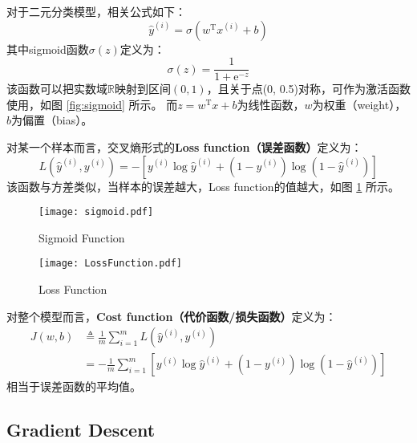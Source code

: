 对于二元分类模型，相关公式如下：
\begin{equation}
    \hat{y}^{(i)} = \sigma(w^\mathrm{T} x^{(i)} + b) \label{eq:logistic}
\end{equation}
其中sigmoid函数$\sigma(z)$定义为：
\begin{equation}
    \sigma(z) = \frac{1}{1 + \mathrm{e}^{-z}} \label{eq:sigmoid}
\end{equation}
该函数可以把实数域$\mathbb{R}$映射到区间$(0, 1)$，且关于点(0, 0.5)对称，可作为激活函数使用，如图 \ref{fig:sigmoid} 所示。
而$z = w^\mathrm{T} x + b$为线性函数，$w$为权重（weight），$b$为偏置（bias）。

对某一个样本而言，交叉熵形式的\textbf{Loss function（误差函数）}定义为：
\begin{equation}
    L(\hat{y}^{(i)}, y^{(i)}) = -\left[y^{(i)} \log \hat{y}^{(i)} + (1 - y^{(i)}) \log (1 - \hat{y}^{(i)})\right] \label{eq:loss}
\end{equation}
该函数与方差类似，当样本的误差越大，Loss function的值越大，如图 \ref{fig:loss} 所示。
\begin{figure}[h!bt]
    \centering
    \begin{minipage}[t]{0.48\textwidth}
        \centering
        \texttt{[image: sigmoid.pdf]}
        \caption{Sigmoid Function}
        \label{fig:sigmoid}
    \end{minipage}
    \begin{minipage}[t]{0.48\textwidth}
        \centering
        \texttt{[image: LossFunction.pdf]}
        \caption{Loss Function}
        \label{fig:loss}
    \end{minipage}
\end{figure}

对整个模型而言，\textbf{Cost function（代价函数/损失函数）}定义为：
\begin{equation}
    \begin{aligned}
        J(w, b) &\triangleq  \frac{1}{m} \sum_{i=1}^{m} L(\hat{y}^{(i)}, y^{(i)}) \\
        &= -\frac{1}{m} \sum_{i=1}^{m} \left[y^{(i)} \log \hat{y}^{(i)} + (1 - y^{(i)}) \log (1 - \hat{y}^{(i)})\right] \label{eq:cost}
    \end{aligned}
\end{equation}
相当于误差函数的平均值。

\subsection{Gradient Descent}

